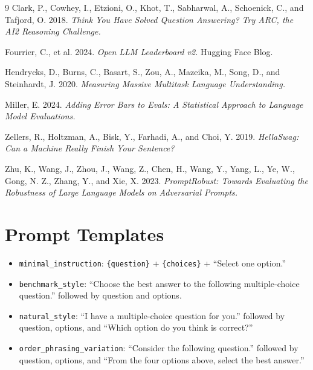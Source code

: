 \documentclass[11pt]{article}
\theoremstyle{definition}
\begin{document}
\begin{thebibliography}{9}
Clark, P., Cowhey, I., Etzioni, O., Khot, T., Sabharwal, A., Schoenick, C., and Tafjord, O. 2018.
\textit{Think You Have Solved Question Answering? Try ARC, the AI2 Reasoning Challenge.}

Fourrier, C., et al. 2024.
\textit{Open LLM Leaderboard v2.} Hugging Face Blog.

Hendrycks, D., Burns, C., Basart, S., Zou, A., Mazeika, M., Song, D., and Steinhardt, J. 2020.
\textit{Measuring Massive Multitask Language Understanding.}

Miller, E. 2024.
\textit{Adding Error Bars to Evals: A Statistical Approach to Language Model Evaluations.}

Zellers, R., Holtzman, A., Bisk, Y., Farhadi, A., and Choi, Y. 2019.
\textit{HellaSwag: Can a Machine Really Finish Your Sentence?}

Zhu, K., Wang, J., Zhou, J., Wang, Z., Chen, H., Wang, Y., Yang, L., Ye, W., Gong, N. Z., Zhang, Y., and Xie, X. 2023.
\textit{PromptRobust: Towards Evaluating the Robustness of Large Language Models on Adversarial Prompts.}
\end{thebibliography}

\appendix

\section{Prompt Templates}

\begin{itemize}[leftmargin=*]
    \item \texttt{minimal\_instruction}: \verb|{question}| + \verb|{choices}| + ``Select one option.''
    \item \texttt{benchmark\_style}: ``Choose the best answer to the following multiple-choice question.'' followed by question and options.
    \item \texttt{natural\_style}: ``I have a multiple-choice question for you.'' followed by question, options, and ``Which option do you think is correct?''
    \item \texttt{order\_phrasing\_variation}: ``Consider the following question.'' followed by question, options, and ``From the four options above, select the best answer.''
\end{itemize}
\end{document}

